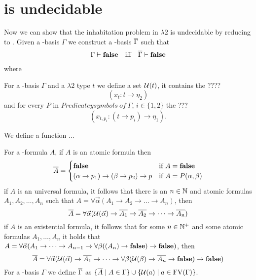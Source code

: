 \section{\lambdaInhab{} is undecidable}
Now we can show that the inhabitation problem in $\lambda2$ %
is undecidable by reducing \PCons{} to \lambdaInhab{}. Given a \SysP-basis $\Gamma$ we construct a \lambdaTwo-basis $\overline{\Gamma}$ such that 
\begin{align*}
\Gamma\vdash\textbf{false}&&\text{iff}&&\overline{\Gamma}\vdash\textbf{false}
\end{align*}
where \false{} 

\begin{definition}
For a \SysP-basis $\Gamma$ and a $\lambda2$ type $t$ we define a set $\mathcal{U}(t)$, it contains the ???? \[(x_t:t\to\eta_2)\] and for every $P$ in $Predicateysymbols~of~\Gamma$, $i\in\{1,2\}$ the ??? \[(x_{t,p_i}:(t\to p_i)\to\eta_1).\]
\end{definition}

\begin{definition}
We define a function ...

For a \SysP-formula $A$, if $A$ is an atomic formula then
\[
\trans{A}=
\begin{cases}
\false &\text{if $A=\false$}\\
(\alpha\to p_1)\to(\beta\to p_2)\to p &\text{if $A=P(\alpha,\beta)$} %
\end{cases}
\]
if $A$ is an universal formula, it follows that there is an $n\in\mathbb{N}$ and atomic formulas $A_1,A_2,\dots,A_n$ such that $A=\forall\vec{\alpha}(A_1\to A_2 \to\dots\to A_n)$, then %
\[\overline{A}=\forall\vec{\alpha}(\mathcal{U}(\vec{\alpha})\to \overline{A_1}\to \overline{A_2} \to\dots\to\overline{ A_n})\]
if $A$ is an existential formula, it follows that for some $n\in\mathbb{N}^+$ and some atomic formulas $A_1,\dots,A_n$ it holds that $A=\forall\vec{\alpha}(A_1 \to\dots\to A_{n-1}\to \forall\beta((A_n)\to\textbf{false})\to\textbf{false})$, then %
\[\overline{A}=\forall\vec{\alpha}(\mathcal{U}(\vec{\alpha})\to \overline{A_1}\to\dots\to\forall\beta(\mathcal{U}(\beta)\to\overline{ A_n}\to\textbf{false})\to\textbf{false})\]
For a \SysP-basis $\Gamma$ we define $\overline{\Gamma}$ as $\{\overline{A}\mid A\in\Gamma\}\cup\{\mathcal{U}(a)\mid a\in\text{FV}(\Gamma)\}$. %

\end{definition}

